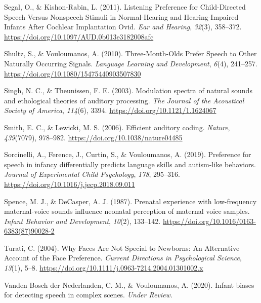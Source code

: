 \documentclass[
  english,
  man]{apa6}
\begin{document}
\leavevmode\hypertarget{ref-segal_listening_2011}{}%
Segal, O., \& Kishon-Rabin, L. (2011). Listening Preference for Child-Directed Speech Versus Nonspeech Stimuli in Normal-Hearing and Hearing-Impaired Infants After Cochlear Implantation Ovid. \emph{Ear and Hearing}, \emph{32}(3), 358--372. \url{https://doi.org/10.1097/AUD.0b013e3182008afc}

\leavevmode\hypertarget{ref-shultz_three-month-olds_2010}{}%
Shultz, S., \& Vouloumanos, A. (2010). Three-Month-Olds Prefer Speech to Other Naturally Occurring Signals. \emph{Language Learning and Development}, \emph{6}(4), 241--257. \url{https://doi.org/10.1080/15475440903507830}

\leavevmode\hypertarget{ref-singh_modulation_2003}{}%
Singh, N. C., \& Theunissen, F. E. (2003). Modulation spectra of natural sounds and ethological theories of auditory processing. \emph{The Journal of the Acoustical Society of America}, \emph{114}(6), 3394. \url{https://doi.org/10.1121/1.1624067}

\leavevmode\hypertarget{ref-smith_efficient_2006}{}%
Smith, E. C., \& Lewicki, M. S. (2006). Efficient auditory coding. \emph{Nature}, \emph{439}(7079), 978--982. \url{https://doi.org/10.1038/nature04485}

\leavevmode\hypertarget{ref-sorcinelli_preference_2019}{}%
Sorcinelli, A., Ference, J., Curtin, S., \& Vouloumanos, A. (2019). Preference for speech in infancy differentially predicts language skills and autism-like behaviors. \emph{Journal of Experimental Child Psychology}, \emph{178}, 295--316. \url{https://doi.org/10.1016/j.jecp.2018.09.011}

\leavevmode\hypertarget{ref-spence_prenatal_1987}{}%
Spence, M. J., \& DeCasper, A. J. (1987). Prenatal experience with low-frequency maternal-voice sounds influence neonatal perception of maternal voice samples. \emph{Infant Behavior and Development}, \emph{10}(2), 133--142. \url{https://doi.org/10.1016/0163-6383(87)90028-2}

\leavevmode\hypertarget{ref-turati_why_2004}{}%
Turati, C. (2004). Why Faces Are Not Special to Newborns: An Alternative Account of the Face Preference. \emph{Current Directions in Psychological Science}, \emph{13}(1), 5--8. \url{https://doi.org/10.1111/j.0963-7214.2004.01301002.x}

\leavevmode\hypertarget{ref-vanden_bosch_der_nederlanden_infant_2020}{}%
Vanden Bosch der Nederlanden, C. M., \& Vouloumanos, A. (2020). Infant biases for detecting speech in complex scenes. \emph{Under Review}.
\end{document}
